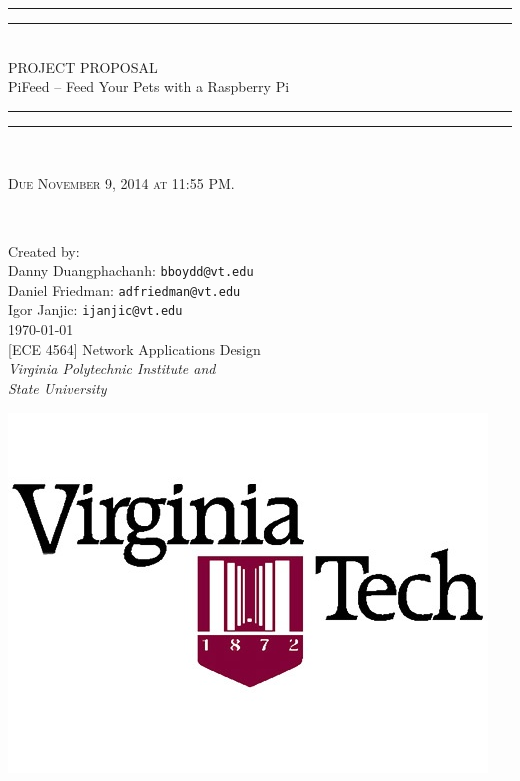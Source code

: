 
\begin{titlepage}

\centering
\vspace*{\baselineskip}

\rule{\textwidth}{1.6pt}\vspace*{-\baselineskip}\vspace*{2pt}
\rule{\textwidth}{0.4pt}\\[\baselineskip]

{\LARGE PROJECT PROPOSAL\\[0.3\baselineskip]
PiFeed -- Feed Your Pets with a Raspberry Pi\\[0.2\baselineskip]
 }

\rule{\textwidth}{0.4pt}\vspace*{-\baselineskip}\vspace{3.2pt}
\rule{\textwidth}{1.6pt}\\[\baselineskip]

\wl

\scshape Due November 9, 2014 at 11:55 PM.
{\small 
\\[\baselineskip]\par}

\vfill

Created by:\\[0.2\baselineskip]
{Danny Duangphachanh: \texttt{bboydd@vt.edu}}\\[0.2\baselineskip]
{Daniel Friedman:     \texttt{adfriedman@vt.edu}}\\[0.2\baselineskip]
{Igor Janjic:         \texttt{ijanjic@vt.edu}}\\[0.4\baselineskip]
{\small \today}\\[0.8\baselineskip]
{\small [ECE 4564] Network Applications Design}\\[0.2\baselineskip]
{\small\itshape Virginia Polytechnic Institute and\\ State University}\\[0.2\baselineskip]

\begin{center}
	\includegraphics[scale=0.35]{images/Logo}
\end{center}

\end{titlepage}
